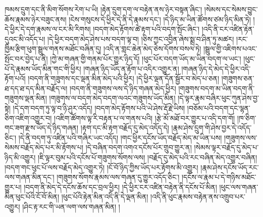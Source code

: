 ཁམས་དྲུག་དང་ནི་མིག་སོགས་རེག་པ་ཡི། །རྟེན་དྲུག་དག་ལ་བརྟེན་ནས་ཉེར་བསྟན་ཞིང་། །སེམས་དང་སེམས་བྱུང་ཆོས་རྣམས་ཉེར་བཟུང་ནས། །ངེས་གསུངས་དེ་ཕྱིར་དེ་ནི་དེ་རྣམས་དང་། །དེ་ཉིད་མ་ཡིན་ཚོགས་ཙམ་ཉིད་མིན་ཏེ། །དེ་ཕྱིར་དེ་དག་རྣམས་ལ་ངར་མི་རིགས། །བདག་མེད་རྟོགས་ཚེ་རྟག་པའི་བདག་སྤོང་ཞིང་། །འདི་ནི་ངར་འཛིན་རྟེན་དུའང་མི་འདོད་པ། །དེ་ཕྱིར་བདག་མེད་ཤེས་པས་བདག་ལྟ་བ། །ཅིས་ཀྱང་འབྱིན་ཞེས་སྨྲ་བ་ཤིན་ཏུ་མཚར། །རང་ཁྱིམ་རྩིག་ཕུག་སྦྲུལ་གནས་མཐོང་བཞིན་དུ། །འདི་ན་གླང་ཆེན་མེད་ཅེས་དོགས་བསལ་ཏེ། །སྦྲུལ་གྱི་འཇིགས་པའང་སྤོང་བར་བྱེད་པ་ནི། །ཀྱེ་མ་གཞན་གྱི་གནམ་པོར་གྱུར་ཉིད་དོ། །ཕུང་པོར་བདག་ཡོད་མ་ཡིན་བདག་ལ་ཡང་། །ཕུང་པོ་དེ་རྣམས་ཡོད་མིན་གང་གི་ཕྱིར། །གཞན་ཉིད་ཡོད་ན་རྟོག་པ་འདིར་འགྱུར་ན། །གཞན་ཉིད་དེ་མེད་དེ་ཕྱིར་འདི་རྟོག་པའོ། །བདག་ནི་གཟུགས་དང་ལྡན་མིན་མེད་པའི་ཕྱིར། །དེ་ཕྱིར་ལྡན་དོན་སྦྱོར་བ་མེད་པ་ཅན། །གཟུགས་ཅན་ཐ་དད་ཐ་དད་མིན་བརྗོད་ལ། །བདག་ནི་གཟུགས་ལས་དེ་ཉིད་གཞན་མེད་ཕྱིར། །གཟུགས་བདག་མ་ཡིན་བདག་ནི་གཟུགས་ལྡན་མིན། །གཟུགས་ལ་བདག་མེད་བདག་ལའང་གཟུགས་ཡོད་མིན། །དེ་ལྟར་རྣམ་བཞིར་ཕུང་ཀུན་ཤེས་བྱ་སྟེ། །དེ་དག་བདག་ཏུ་ལྟ་བ་ཉི་ཤུར་འདོད། །བདག་མེད་རྟོགས་པའི་ཡེ་ཤེས་རྡོ་རྗེ་ཡིས། །བཅོམ་པའི་བདག་དང་ལྷན་ཅིག་འཇིག་འགྱུར་བ། །འཇིག་ཚོགས་ལྟ་རི་བརྟན་པ་ལ་གནས་པའི། །རྩེ་མོ་མཐོ་བར་གྱུར་པ་འདི་དག་གོ། །ཁ་ཅིག་གང་ཟག་རྫས་ཡོད་དེ་ཉིད་གཞན། །རྟག་དང་མི་རྟག་བརྗོད་དུ་མེད་འདོད་དེ། །རྣམ་ཤེས་དྲུག་གི་ཤེས་བྱར་དེ་འདོད་ཅིང་། །དེ་ནི་བདག་ཏུ་འཛིན་པའི་གཞིར་ཡང་འདོད། །གང་ཕྱིར་དངོས་ཡོད་བརྗོད་མེད་མ་ཡིན་པས། །གཟུགས་ལས་སེམས་བརྗོད་མེད་པར་མི་རྟོགས་པ། །དེ་བཞིན་བདག་འགའ་དངོས་པོར་གྲུབ་གྱུར་ན། །སེམས་ལྟར་བརྗོད་དུ་མེད་པ་ཉིད་མི་འགྱུར། །ཇི་ལྟར་བུམ་པའི་དངོས་པོ་གཟུགས་སོགས་ལས། །བརྗོད་དུ་མེད་པའི་རང་བཞིན་མེད་འགྱུར་བཞིན། །བདག་གང་ཕུང་པོ་ལས་བརྗོད་མེད་འགྱུར་ཏེ། །ངོ་བོ་ཉིད་ཀྱིས་ཡོད་པར་རྟོགས་མི་འགྱུར། །རྣམ་ཤེས་དངོས་ཡོད་རང་ལས་གཞན་མིན་དང་། །གཟུགས་སོགས་རྣམས་ལས་གཞན་དུ་གྱུར་འདོད་ཅིང་། །དངོས་ལ་རྣམ་པ་དེ་གཉིས་མཐོང་གྱུར་པ། །བདག་ནི་མེད་དེ་དངོས་ཆོས་དང་བྲལ་ཕྱིར། །དེ་ཕྱིར་ངར་འཛིན་བརྟེན་ནི་དངོས་པོ་མིན། །ཕུང་ལས་གཞན་མིན་ཕུང་པོའི་ངོ་བོ་མིན། །ཕུང་པོའི་རྟེན་མིན་འདི་ནི་དེ་ལྡན་མིན། །འདི་ནི་ཕུང་རྣམས་བརྟེན་ནས་འགྲུབ་པར་འགྱུར། །ཤིང་རྟ་རང་གི་ཡན་ལག་ལས་གཞན་མིན། །
